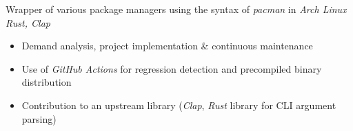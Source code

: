 \documentclass{resume}
\begin{document}
Wrapper of various package managers using the syntax of \textit{pacman} in \textit{Arch Linux} \hfill \textit{Rust, Clap}
\begin{itemize}
  \item Demand analysis, project implementation \& continuous maintenance
  \item Use of \textit{GitHub Actions} for regression detection and precompiled binary distribution
  \item Contribution to an upstream library (\textit{Clap}, \textit{Rust} library for CLI argument parsing)
\end{itemize}



\end{document}
